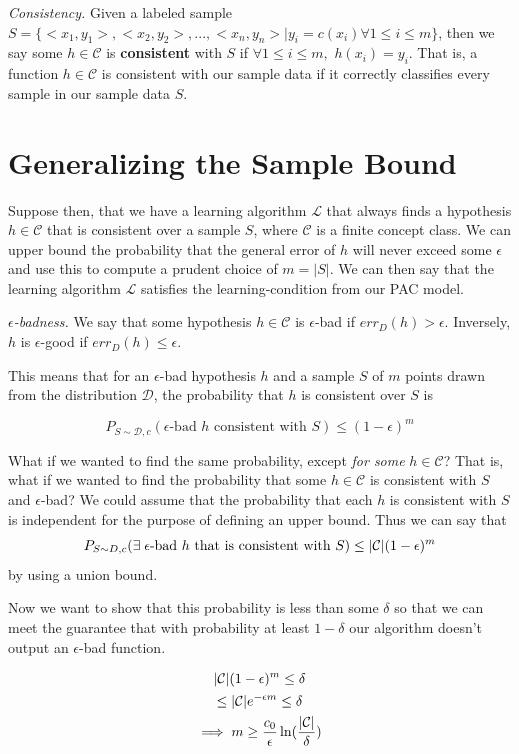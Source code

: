 \documentclass{article}
\DeclarePairedDelimiter\abs{\lvert}{\rvert}
\begin{document}
\emph{Consistency.} Given a labeled
sample $S = \{<x_1, y_1>, <x_2, y_2>, ..., <x_n, y_n> | y_i = c(x_i)
\forall 1 \leq i \leq m\}$, then we say some $h \in \mathcal{C}$ is
\textbf{consistent} with $S$ if $\forall 1 \leq i \leq m,$
$h(x_i) = y_i$. That is, a function $h \in \mathcal{C}$ is consistent
with our sample data if it correctly classifies every sample in our
sample data $S$.

\section{Generalizing the Sample Bound}
Suppose then, that we have a learning algorithm $\mathcal{L}$ that always
finds a hypothesis $h \in \mathcal{C}$ that is consistent over a sample $S$,
where $\mathcal{C}$ is a finite concept class. We can upper bound the
probability that the general error of $h$ will never exceed some $\epsilon$
and use this to compute a prudent choice of $m = |S|$. We can then say that
the learning algorithm $\mathcal{L}$ satisfies the learning-condition from
our PAC model.

\emph{$\epsilon$-badness.} We say that some hypothesis $h \in \mathcal{C}$
is $\epsilon$-bad if $err_D(h) > \epsilon$. Inversely, $h$ is
$\epsilon$-good if $err_D(h) \leq \epsilon$.

This means that for an $\epsilon$-bad hypothesis $h$ and a sample $S$ of
$m$ points drawn from the distribution $\mathcal{D}$, the probability
that $h$ is consistent over $S$ is

$$P_{S \sim \mathcal{D}, c}(\text{$\epsilon$-bad $h$ consistent with $S$}) \leq
        (1-\epsilon)^m$$

What if we wanted to find the same probability, except \textit{for some}
$h \in \mathcal{C}$? That is, what if we wanted to find the probability
that some $h \in \mathcal{C}$ is consistent with $S$ and $\epsilon$-bad?
We could assume that the probability that each $h$ is consistent with
$S$ is independent for the purpose of defining an upper bound. Thus we
can say that
\[ P_{S \sim D, c} (\text{$\exists\;\epsilon$-bad $h$ that is consistent
with $S$}) \leq \abs{\mathcal{C}}(1-\epsilon)^m \] by using a union bound.

Now we want to show that this probability is less than some $\delta$ so
that we can meet the guarantee that with probability at least $1-\delta$
our algorithm doesn't output an $\epsilon$-bad function.

\begin{gather*}
    |\mathcal{C}|(1-\epsilon)^m \leq \delta\\
        \leq |\mathcal{C}|e^{-\epsilon m} \leq \delta\\
        \implies  m \geq \frac{c_0}{\epsilon}\ln(\frac{\abs{\mathcal{C}}}{\delta})
\end{gather*}
\end{document}
